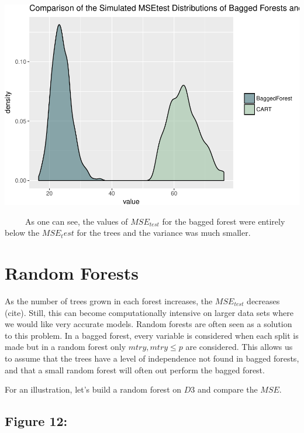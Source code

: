\documentclass[12pt,twoside]{reedthesis}
\begin{document}
  \begin{center}\includegraphics{Thesis_files/figure-latex/fig11-1} \end{center}
  
  ~~~~~As one can see, the values of \(MSE_{test}\) for the bagged forest
  were entirely below the \(MSE_test\) for the trees and the variance was
  much smaller.
  
  \section{Random Forests}\label{random-forests}
  
  As the number of trees grown in each forest increases, the
  \(MSE_{test}\) decreases (cite). Still, this can become computationally
  intensive on larger data sets where we would like very accurate models.
  Random forests are often seen as a solution to this problem. In a bagged
  forest, every variable is considered when each split is made but in a
  random forest only \(mtry, mtry \leq p\) are considered. This allows us
  to assume that the trees have a level of independence not found in
  bagged forests, and that a small random forest will often out perform
  the bagged forest.
  
  For an illustration, let's build a random forest on \(D3\) and compare
  the \(MSE\).
  
  \subsection{Figure 12:}\label{figure-12}
  
\end{document}
